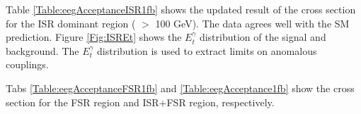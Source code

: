 \documentclass[12pt,twoside,letterpaper]{article}
\begin{document}

Table \ref{Table:eegAcceptanceISR1fb} shows the updated result of the
cross section for the ISR dominant region ( \Meeg $>$ 100 GeV). The
data agrees well with the SM prediction. Figure \ref{Fig:ISREt} shows
the $E_t^{\gamma}$ distribution of the signal and background. The
$E_t^{\gamma}$ distribution is used to extract limits on \Zg anomalous
couplings.

Tabs \ref{Table:eegAcceptanceFSR1fb} and \ref{Table:eegAcceptance1fb} show the cross section for the FSR region and ISR+FSR region, respectively. 
\end{document}
